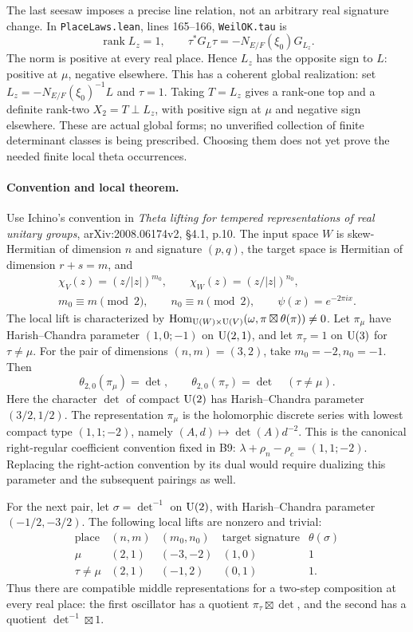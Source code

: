\documentclass[11pt]{article}
\theoremstyle{definition}\newtheorem{definition}[theorem]{Definition}\newtheorem{remark}[theorem]{Remark}
\begin{document}
The last seesaw imposes a precise line relation, not an arbitrary real signature change. In \texttt{PlaceLaws.lean}, lines 165--166, \texttt{WeilOK.tau} is
\[
 \operatorname{rank}L_z=1,\qquad
 \tau^*G_L\tau=-N_{E/F}(\xi_0)G_{L_z}.
 \tag{B15b}
\]
The norm is positive at every real place. Hence $L_z$ has the opposite sign to $L$: positive at $\mu$, negative elsewhere. This has a coherent global realization: set $L_z=-N_{E/F}(\xi_0)^{-1}L$ and $\tau=1$. Taking $T=L_z$ gives a rank-one top and a definite rank-two $X_2=T\perp L_z$, with positive sign at $\mu$ and negative sign elsewhere. These are actual global forms; no unverified collection of finite determinant classes is being prescribed. Choosing them does not yet prove the needed finite local theta occurrences.

\paragraph{Convention and local theorem.}
Use Ichino's convention in \emph{Theta lifting for tempered representations of real unitary groups}, arXiv:2008.06174v2, \S4.1, p.10. The input space $W$ is skew-Hermitian of dimension $n$ and signature $(p,q)$, the target space is Hermitian of dimension $r+s=m$, and
\begin{equation}
\begin{gathered}
 \chi_V(z)=(z/|z|)^{m_0},\qquad
 \chi_W(z)=(z/|z|)^{n_0},\\
 m_0\equiv m\pmod2,\qquad n_0\equiv n\pmod2,
 \qquad \psi(x)=e^{-2\pi i x}.
\end{gathered}
 \tag{B15c}
\end{equation}
The local lift is characterized by
$\operatorname{Hom}_{\operatorname{U}(W)\times\operatorname{U}(V)}(\omega,\pi\boxtimes\theta(\pi))\ne0$.
Let $\pi_\mu$ have Harish--Chandra parameter $(1,0;-1)$ on $\operatorname{U}(2,1)$, and let $\pi_\tau=1$ on $\operatorname{U}(3)$ for $\tau\ne\mu$. For the pair of dimensions $(n,m)=(3,2)$, take $m_0=-2,n_0=-1$. Then
\[
 \theta_{2,0}(\pi_\mu)=\det,\qquad
 \theta_{2,0}(\pi_\tau)=\det\quad(\tau\ne\mu).
 \tag{B15d}
\]
Here the character $\det$ of compact $\operatorname{U}(2)$ has Harish--Chandra parameter $(3/2,1/2)$.
The representation $\pi_\mu$ is the holomorphic discrete series with lowest compact type $(1,1;-2)$, namely $(A,d)\mapsto\det(A)d^{-2}$. This is the canonical right-regular coefficient convention fixed in B9: $\lambda+\rho_n-\rho_c=(1,1;-2)$. Replacing the right-action convention by its dual would require dualizing this parameter and the subsequent pairings as well.

For the next pair, let $\sigma=\det^{-1}$ on $\operatorname{U}(2)$, with Harish--Chandra parameter $(-1/2,-3/2)$. The following local lifts are nonzero and trivial:
\[
\begin{array}{c|c|c|c|c}
\text{place}&(n,m)&(m_0,n_0)&\text{target signature}&\theta(\sigma)\\ \hline
\mu&(2,1)&(-3,-2)&(1,0)&1\\
\tau\ne\mu&(2,1)&(-1,2)&(0,1)&1.
\end{array}
 \tag{B15e}
\]
Thus there are compatible middle representations for a two-step composition at every real place: the first oscillator has a quotient $\pi_\tau\boxtimes\det$, and the second has a quotient $\det^{-1}\boxtimes1$.
\end{document}
